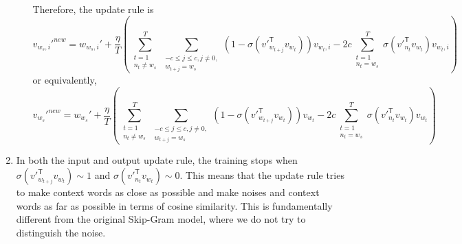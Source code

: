 \documentclass[
	12pt, %
]{../Template/fphw}
\newcommand{\T}{\mathsf{T}}
\begin{document}
\begin{enumerate}[label=(\arabic*)]
\begin{enumerate}[label=(\roman*)]
\begin{align}
            \end{align}
            Therefore, the update rule is
            \begin{equation}
                v_{w_s,i}'^{new} = w_{w_s,i}'+ \frac{\eta}{T}\left(\sum_{\substack{t=1\\n_t \neq w_s}}^{T}\sum_{\substack{-c\leq j \leq c, j\neq 0, \\ w_{t+j}=w_s}}(1-\sigma(v'^\T_{w_{t+j}} v_{w_t})) v_{w_t,i}-2c\sum_{\substack{t=1\\n_t = w_s}}^T\sigma(v'^\T_{n_t} v_{w_t})v_{w_t,i} \right)
            \end{equation}
            or equivalently,
            \begin{equation}
                v_{w_s}'^{new} = w_{w_s}'+ \frac{\eta}{T}\left(\sum_{\substack{t=1\\n_t \neq w_s}}^{T}\sum_{\substack{-c\leq j \leq c, j\neq 0, \\ w_{t+j}=w_s}}(1-\sigma(v'^\T_{w_{t+j}} v_{w_t})) v_{w_t}-2c\sum_{\substack{t=1\\n_t = w_s}}^T\sigma(v'^\T_{n_t} v_{w_t})v_{w_t} \right)
            \end{equation}
            \end{enumerate}
    \item In both the input and output update rule, the training stops when $\sigma(v'^\T_{w_{t+j}} v_{w_t}) \sim 1$ and $\sigma(v'^\T_{n_t} v_{w_t}) \sim 0$. This means that the update rule tries to make context words as close as possible and make noises and context words as far as possible in terms of cosine similarity. This is fundamentally different from the original Skip-Gram model, where we do not try to distinguish the noise.
    
\end{enumerate}
\end{document}
